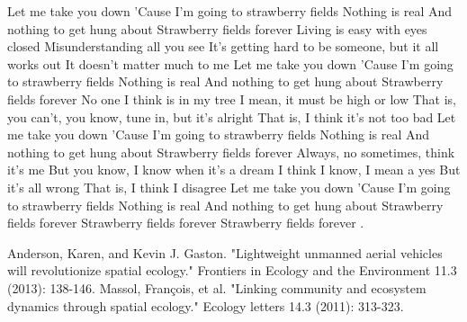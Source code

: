 \documentclass[12pt]{article}
\begin{document}
Let me take you down
'Cause I'm going to strawberry fields
Nothing is real
And nothing to get hung about
Strawberry fields forever
Living is easy with eyes closed
Misunderstanding all you see
It's getting hard to be someone, but it all works out
It doesn't matter much to me
Let me take you down
'Cause I'm going to strawberry fields
Nothing is real
And nothing to get hung about
Strawberry fields forever
No one I think is in my tree
I mean, it must be high or low
That is, you can't, you know, tune in, but it's alright
That is, I think it's not too bad
Let me take you down
'Cause I'm going to strawberry fields
Nothing is real 
And nothing to get hung about
Strawberry fields forever
Always, no sometimes, think it's me
But you know, I know when it's a dream
I think I know, I mean a yes
But it's all wrong
That is, I think I disagree
Let me take you down
'Cause I'm going to strawberry fields
Nothing is real
And nothing to get hung about
Strawberry fields forever
Strawberry fields forever
Strawberry fields forever \cite{Anderson2013}.

\begin{thebibliography}{999}
    Anderson, Karen, and Kevin J. Gaston. "Lightweight unmanned aerial vehicles will revolutionize spatial ecology." Frontiers in Ecology and the Environment 11.3 (2013): 138-146.
%
    Massol, François, et al. "Linking community and ecosystem dynamics through spatial ecology." Ecology letters 14.3 (2011): 313-323.
\end{thebibliography}
\end{document}
